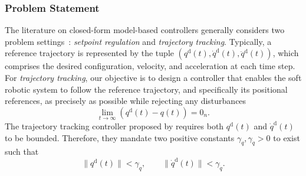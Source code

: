 \subsubsection{Problem Statement}
The literature on closed-form model-based controllers generally considers two problem settings~\citep{sciavicco2012modelling}: \emph{setpoint regulation} and \emph{trajectory tracking}. Typically, a reference trajectory is represented by the tuple $(q^\mathrm{d}(t), \dot{q}^\mathrm{d}(t), \ddot{q}^\mathrm{d}(t))$, which comprises the desired configuration, velocity, and acceleration at each time step. For \emph{trajectory tracking}, our objective is to design a controller that enables the soft robotic system to follow the reference trajectory, and specifically its positional references, as precisely as possible while rejecting any disturbances
\begin{equation}
    \lim_{t \to \infty} \left ( q^\mathrm{d}(t) - q(t) \right ) = 0_n.
\end{equation}
The trajectory tracking controller proposed by \citet{della2020model} requires both $q^\mathrm{d}(t)$ and $\dot{q}^\mathrm{d}(t)$ to be bounded. Therefore, they mandate two positive constants $\gamma_q, \gamma_{\dot{q}} > 0$ to exist such that
\begin{equation}
    \lVert q^\mathrm{d}(t) \rVert < \gamma_q,
    \qquad
    \lVert \dot{q}^\mathrm{d}(t) \rVert < \gamma_{\dot{q}}.
\end{equation}
